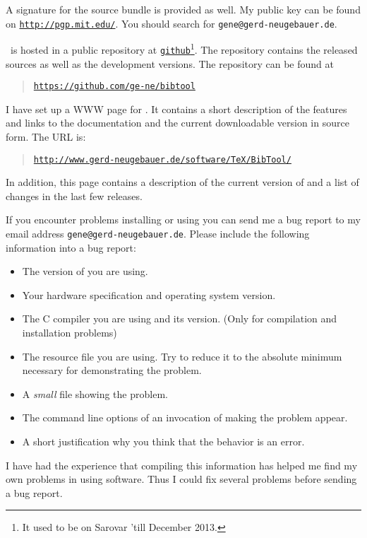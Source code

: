 \documentclass[11pt,a4paper]{scrbook}
\newcommand\Link[2]{\href{#1}{\texttt{#2}}}
\begin{document}
A signature for the source bundle is provided as well. My public key can be
found  on \Link{http://pgp.mit.edu/}{http://pgp.mit.edu/}. You should search
for \texttt{gene@gerd-neugebauer.de}.

\BibTool\ is hosted in a public repository at
\Link{https://github.com}{github}\footnote{It used to be on
  Sarovar 'till December 2013.}. The repository contains the released sources
as well as the development versions. The repository can be found at
\begin{quote}
  \Link{https://github.com/ge-ne/bibtool}{https://github.com/ge-ne/bibtool}
\end{quote}

I have set up a WWW page for \BibTool. It contains a short description of the
features and links to the documentation and the current downloadable version
in source form. The URL is:

\begin{quote}
  \Link{http://www.gerd-neugebauer.de/software/TeX/BibTool/}{http://www.gerd-neugebauer.de/software/TeX/BibTool/}
\end{quote}

In addition, this page contains a description of the current version of
\BibTool{} and a list of changes in the last few releases.

If you encounter problems installing or using \BibTool{} you can send me a bug
report to my email address \texttt{gene@gerd-neugebauer.de}. Please include
the following information into a bug report:
\begin{itemize}
\item The version of \BibTool{} you are using.
\item Your hardware specification and operating system version.
\item The C compiler you are using and its version. (Only for compilation and
  installation problems)
\item The resource file you are using. Try to reduce it to the absolute
  minimum necessary for demonstrating the problem.
\item A \emph{small} \BibTeX{} file showing the problem.
\item The command line options of an invocation of \BibTool{} making
  the problem appear.
\item A short justification why you think that the behavior is an error.
\end{itemize}

I have had the experience that compiling this information has helped me find
my own problems in using software. Thus I could fix several problems before
sending a bug report.
\end{document}
